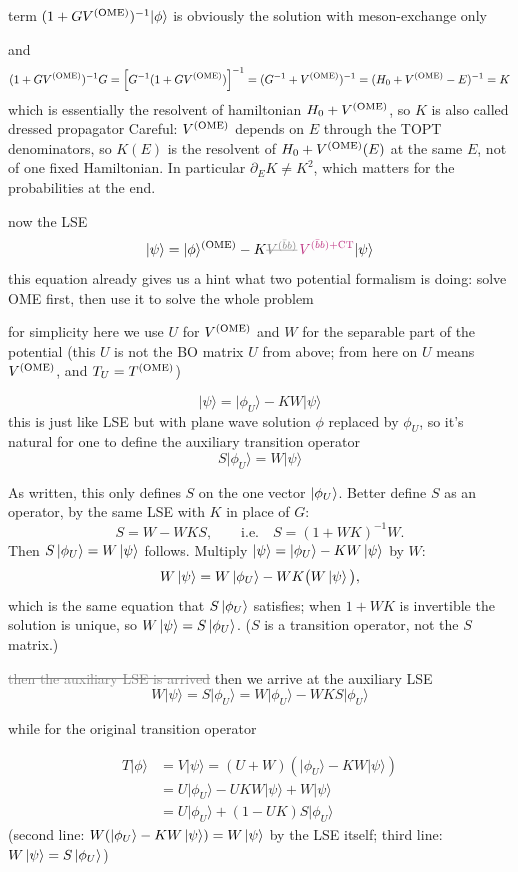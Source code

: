 \documentclass[11pt,a4paper]{article}
\renewcommand{\VQQ}{V^{(\bar bb)}}
\renewcommand{\VOME}{V^{\rm (OME)}}
\renewcommand{\TOME}{T^{\rm (OME)}}
\newcommand{\ai}[1]{\textcolor{aicolor}{#1}}
\newcommand{\aifix}[2]{\textcolor{gray}{\sout{#1}} \textcolor{aicolor}{#2}}
\newcommand{\aifixm}[2]{\textcolor{gray}{\text{\sout{$#1$}}}\,\textcolor{aicolor}{#2}}
\newcommand{\ai}[1]{#1}
\newcommand{\aifix}[2]{#2}
\newcommand{\aifixm}[2]{#2}
\newenvironment{aiadd}{\par}{\par}
\begin{document}
term $(1 + G\VOME)^{-1}\lvert \phi \rangle$ is obviously the solution with meson-exchange only

and
\[
	(1 + G\VOME)^{-1}G = \left[G^{-1}(1 + G\VOME)\right]^{-1} = (G^{-1} + \VOME)^{-1} = (H_0 + \VOME - E)^{-1} = K
\]
which is essentially the resolvent of hamiltonian $H_0 + \VOME$, so $K$ is also called dressed propagator \ai{Careful: $\VOME$ depends on $E$ through the TOPT denominators, so $K(E)$ is the resolvent of $H_0+\VOME(E)$ at the same $E$, not of one fixed Hamiltonian. In particular $\partial_EK\neq K^2$, which matters for the probabilities at the end.}

now the LSE
\[
	\lvert \psi \rangle = \lvert \phi \rangle ^{\rm (OME)} - K\aifixm{\VQQ}{V^{(\bar bb)+{\rm CT}}}\lvert \psi \rangle
\]
this equation already gives us a hint what two potential formalism is doing: solve OME first, then use it to solve the whole problem

for simplicity here we use $U$ for $\VOME$ and $W$ for the separable part of the potential \ai{(this $U$ is not the BO matrix $U$ from above; from here on $U$ means $\VOME$, and $T_U=\TOME$)}

\[
	\lvert \psi \rangle = \lvert \phi_U \rangle - KW\lvert \psi \rangle
\]
this is just like LSE but with plane wave solution $\phi$ replaced by $\phi_U$, so it's natural for one to define the auxiliary transition operator
\[
	S\lvert \phi_U \rangle = W\lvert \psi \rangle
\]
\begin{aiadd}
	As written, this only defines $S$ on the one vector $\ket{\phi_U}$. Better define $S$ as an operator, by the same LSE with $K$ in place of $G$:
	\[
		S=W-WKS,\qquad\text{i.e.}\quad S=(1+WK)^{-1}W .
	\]
	Then $S\ket{\phi_U}=W\ket\psi$ follows. Multiply $\ket\psi=\ket{\phi_U}-KW\ket\psi$ by $W$:
	\[
		W\ket\psi=W\ket{\phi_U}-WK\big(W\ket\psi\big),
	\]
	which is the same equation that $S\ket{\phi_U}$ satisfies; when $1+WK$ is invertible the solution is unique, so $W\ket\psi=S\ket{\phi_U}$. ($S$ is a transition operator, not the $S$ matrix.)
\end{aiadd}

\aifix{then the auxiliary LSE is arrived}{then we arrive at the auxiliary LSE}
\[
	W\lvert \psi \rangle = S\lvert \phi_U \rangle = W\lvert \phi_U \rangle - WKS\lvert \phi_U \rangle
\]

while for the original transition operator

\begin{align}
	T\lvert \phi \rangle & = V\lvert \psi \rangle = (U + W)\left(\lvert \phi_U \rangle - KW\lvert \psi \rangle\right) \\
	                     & = U\lvert \phi_U \rangle - UKW\lvert \psi \rangle + W\lvert \psi \rangle                   \\
	                     & = U\lvert \phi_U \rangle + (1 - UK)S\lvert \phi_U \rangle
\end{align}
\ai{(second line: $W(\ket{\phi_U}-KW\ket\psi)=W\ket\psi$ by the LSE itself; third line: $W\ket\psi=S\ket{\phi_U}$)}
\end{document}
